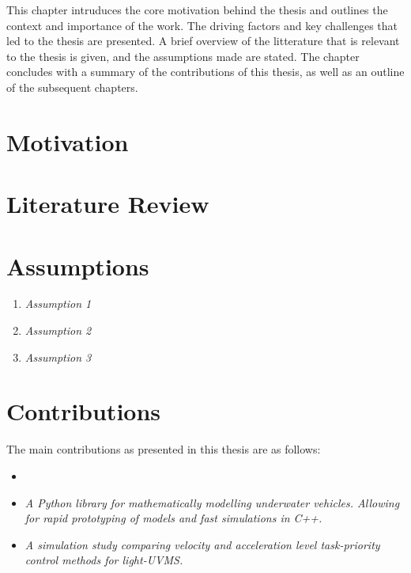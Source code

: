 This chapter intruduces the core motivation behind the thesis and outlines the
context and importance of the work. The driving factors and key challenges that
led to the thesis are presented. A brief overview of the litterature that is
relevant to the thesis is given, and the assumptions made are
stated. The chapter concludes with a summary of the contributions of this thesis,
as well as an outline of the subsequent chapters.


\section{Motivation}

\section{Literature Review}

\section{Assumptions}
\begin{enumerate}
    \item \emph{Assumption 1}
    \item \emph{Assumption 2}
    \item \emph{Assumption 3}
\end{enumerate}

\section{Contributions}

The main contributions as presented in this thesis are as follows:
\begin{itemize}
    \item \emph{}
    \item \emph{A Python library for mathematically modelling underwater vehicles.
    Allowing for rapid prototyping of models and fast simulations in C++.}
    \item \emph{A simulation study comparing velocity and acceleration level
        task-priority control methods for light-UVMS.}
\end{itemize}

